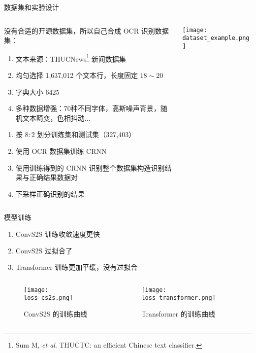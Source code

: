 \begin{frame}[c]{数据集和实验设计}
	\begin{columns}[t]
		{\scriptsize
		\begin{column}[T]{5cm}
			没有合适的开源数据集，所以自己合成 OCR 识别数据集：
			\begin{enumerate}
				\item 文本来源：THUCNews\footnote{Sum M, \textit{et al}. THUCTC: an efficient Chinese text classifier.} 新闻数据集
				\item 均匀选择 1,637,012 个文本行，长度固定 $18 \sim 20$
				\item 字典大小 $6425$
				\item 多种数据增强：70种不同字体，高斯噪声背景，随机文本畸变，色相抖动...
			\end{enumerate}
			
			\begin{enumerate}
				\item 按 $8:2$ 划分训练集和测试集（327,403）
				\item 使用 OCR 数据集训练 CRNN
				\item 使用训练得到的 CRNN 识别整个数据集构造识别结果与正确结果数据对
				\item 下采样正确识别的结果
			\end{enumerate}
		\end{column}
		}%
		\begin{column}[T]{5cm}
			\texttt{[image: dataset\_example.png]}
		\end{column}
	\end{columns}
\end{frame}

\begin{frame}[c]{模型训练}
	\begin{enumerate}
		\item ConvS2S 训练收敛速度更快
		\item ConvS2S 过拟合了
		\item Transformer 训练更加平缓，没有过拟合
	\end{enumerate}
	\begin{columns}[t]
		\begin{column}[T]{5cm}
			\begin{figure}
				\centering
				\texttt{[image: loss\_cs2s.png]}
				\caption{{\scriptsize ConvS2S 的训练曲线}}
			\end{figure}
		\end{column}
		\begin{column}[T]{5cm}
			\begin{figure}
				\centering
				\texttt{[image: loss\_transformer.png]}
				\caption{{\scriptsize Transformer 的训练曲线}}
			\end{figure}
		\end{column}
	\end{columns}
\end{frame}

